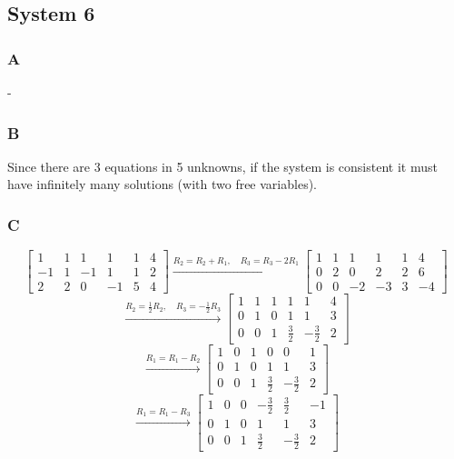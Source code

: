 \documentclass{article}
\begin{document}
\subsection*{System 6}

\subsubsection*{A}

-

\subsubsection*{B}

Since there are 3 equations in 5 unknowns, if the system is consistent it must have infinitely many solutions (with two free variables).

\subsubsection*{C}

\[
	\begin{bmatrix}
		1  & 1 & 1  & 1  & 1 & 4 \\
		-1 & 1 & -1 & 1  & 1 & 2 \\
		2  & 2 & 0  & -1 & 5 & 4
	\end{bmatrix}
	\xrightarrow{R_2 = R_2 + R_1,\quad R_3 = R_3 - 2R_1}
	\begin{bmatrix}
		1 & 1 & 1 & 1 & 1 & 4  \\
		0 & 2 & 0 & 2 & 2 & 6  \\
		0 & 0 & -2 & -3 & 3 & -4
	\end{bmatrix}
\]
\[
	\xrightarrow{R_2 = \frac{1}{2}R_2,\quad R_3 = -\frac{1}{2}R_3}
	\begin{bmatrix}
		1 & 1 & 1 & 1 & 1 & 4 \\
		0 & 1 & 0 & 1 & 1 & 3 \\
		0 & 0 & 1 & \frac{3}{2} & -\frac{3}{2} & 2
	\end{bmatrix}
\]
\[
	\xrightarrow{R_1 = R_1 - R_2}
	\begin{bmatrix}
		1 & 0 & 1 & 0 & 0 & 1 \\
		0 & 1 & 0 & 1 & 1 & 3 \\
		0 & 0 & 1 & \frac{3}{2} & -\frac{3}{2} & 2
	\end{bmatrix}
\]
\[
	\xrightarrow{R_1 = R_1 - R_3}
	\begin{bmatrix}
		1 & 0 & 0 & -\frac{3}{2} & \frac{3}{2} & -1 \\
		0 & 1 & 0 & 1 & 1 & 3 \\
		0 & 0 & 1 & \frac{3}{2} & -\frac{3}{2} & 2
	\end{bmatrix}
\]
\end{document}
